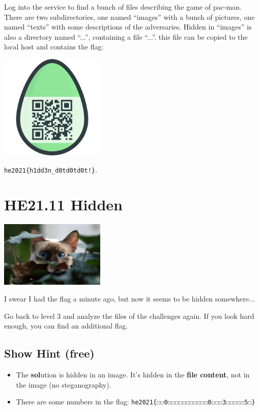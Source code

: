\documentclass[english,a4paper,nols,noindent]{tufte-handout}
\begin{document}
Log into the service to find a bunch of files describing the game of
pac-man.  There are two subdirectories, one named ``images'' with a
bunch of pictures, one named ``texts'' with some descriptions of the
adversaries.  Hidden in ``images'' is also a directory named ``...'',
containing a file ``...''.  this file can be copied to the local host
and contains the flag:

\begin{marginfigure}
    \includegraphics[width=50mm]{ch10/hidden.png}
\end{marginfigure}
\verb+he2021{h1dd3n_d0td0td0t!}+.

\hypertarget{he21.11}{%
\section{HE21.11 Hidden}\label{he21.11}}
\begin{marginfigure}
    \includegraphics[width=50mm]{images/challenge11.jpg}
\end{marginfigure}

I swear I had the flag a minute ago, but now it seems to be hidden somewhere...

Go back to level 3 and analyze the files of the challenges again. If
you look hard enough, you can find an additional flag.

\subsection{Show Hint (free)}
\begin{itemize}
\item The \textbf{sol}ution is hidden in an image. It's hidden in the
  \textbf{file content}, not in the image (no steganography).
\item There are some numbers in the flag: \verb+he2021{☐☐0☐☐☐☐☐☐☐☐☐☐☐0☐☐☐3☐☐☐☐☐5☐}+
\end{itemize}
\end{document}
